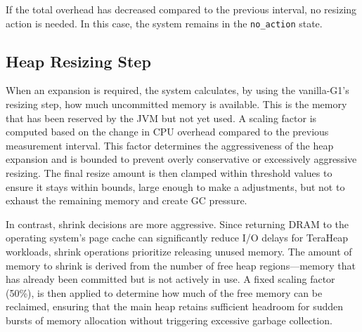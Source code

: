 If the total overhead has decreased compared to the previous interval, no resizing action is needed. In this case,
the system remains in the \texttt{no\_action} state.

\subsection{Heap Resizing Step}

When an expansion is required, the system calculates, by using the vanilla-G1's
resizing step, how much uncommitted memory is available. This is the memory
that has been reserved by the JVM but not yet used. A scaling factor is
computed based on the change in CPU overhead compared to the previous
measurement interval. This factor determines the aggressiveness of the heap
expansion and is bounded to prevent overly conservative or excessively
aggressive resizing. The final resize amount is then clamped within threshold
values to ensure it stays within bounds, large enough to make a adjustments,
but not to exhaust the remaining memory and create GC pressure.

In contrast, shrink decisions are more aggressive. Since returning DRAM to the
operating system's page cache can significantly reduce I/O delays for TeraHeap
workloads, shrink operations prioritize releasing unused memory. The amount of
memory to shrink is derived from the number of free heap regions—memory that
has already been committed but is not actively in use. A fixed scaling factor
(50\%), is then applied to determine how much of the free memory can be
reclaimed, ensuring that the main heap retains sufficient headroom for sudden
bursts of memory allocation without triggering excessive garbage collection.

